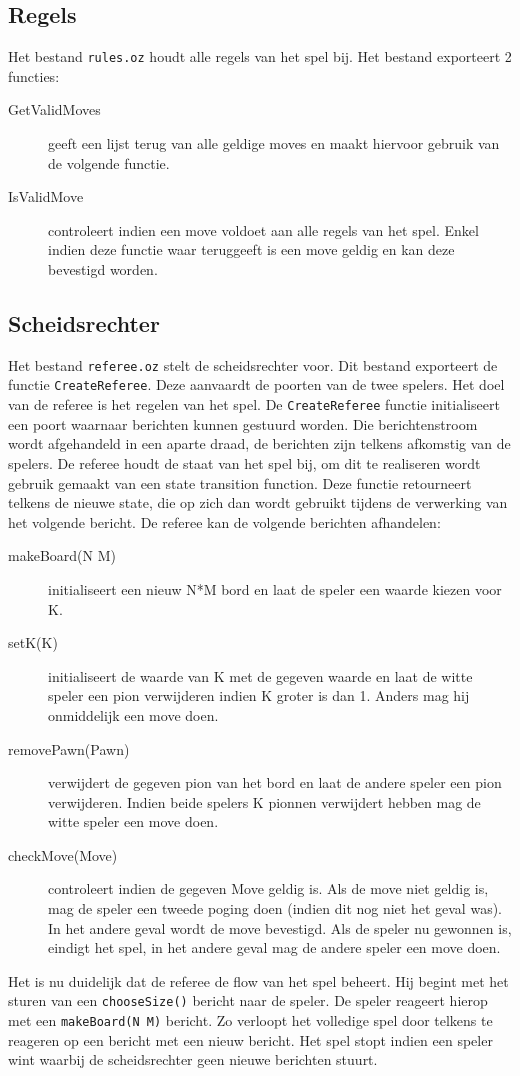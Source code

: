 \documentclass{article}
\begin{document}
\subsection{Regels}
Het bestand \texttt{rules.oz} houdt alle regels van het spel bij. Het bestand exporteert 2 functies: 
\begin{description}
	\item[GetValidMoves] geeft een lijst terug van alle geldige moves en maakt hiervoor gebruik van de volgende functie. 
	\item[IsValidMove] controleert indien een move voldoet aan alle regels van het spel. Enkel indien deze functie waar teruggeeft is een move geldig en kan deze bevestigd worden. 
\end{description}
\subsection{Scheidsrechter}
	Het bestand \texttt{referee.oz} stelt de scheidsrechter voor. Dit bestand exporteert de functie \texttt{CreateReferee}. Deze aanvaardt de poorten van de twee spelers. Het doel van de referee is het regelen van het spel. De \texttt{CreateReferee} functie initialiseert een poort waarnaar berichten kunnen gestuurd worden. Die berichtenstroom wordt afgehandeld in een aparte draad, de berichten zijn telkens afkomstig van de spelers. De referee houdt de staat van het spel bij, om dit te realiseren wordt gebruik gemaakt van een state transition function. Deze functie retourneert telkens de nieuwe state, die op zich dan wordt gebruikt tijdens de verwerking van het volgende bericht.
	De referee kan de volgende berichten afhandelen: 
	\begin{description}
		\item[makeBoard(N M)] initialiseert een nieuw N*M bord en laat de speler een waarde kiezen voor K. 
		\item[setK(K)] initialiseert de waarde van K met de gegeven waarde en laat de witte speler een pion verwijderen indien K groter is dan 1. Anders mag hij onmiddelijk een move doen. 
		\item[removePawn(Pawn)] verwijdert de gegeven pion van het bord en laat de andere speler een pion verwijderen. Indien beide spelers K pionnen verwijdert hebben mag de witte speler een move doen. 
		\item[checkMove(Move)] controleert indien de gegeven Move geldig is. Als de move niet geldig is, mag de speler een tweede poging doen (indien dit nog niet het geval was). In het andere geval wordt de move bevestigd. Als de speler nu gewonnen is, eindigt het spel, in het andere geval mag de andere speler een move doen. 
	\end{description} 
	Het is nu duidelijk dat de referee de flow van het spel beheert. Hij begint met het sturen van een \texttt{chooseSize()} bericht naar de speler. De speler reageert hierop met een \texttt{makeBoard(N M)} bericht. Zo verloopt het volledige spel door telkens te reageren op een bericht met een nieuw bericht. Het spel stopt indien een speler wint waarbij de scheidsrechter geen nieuwe berichten stuurt.
\end{document}
